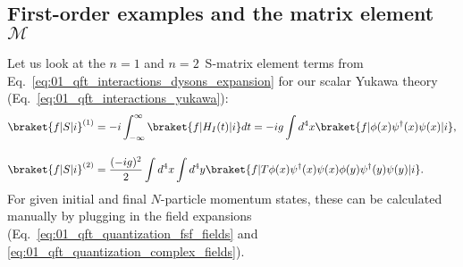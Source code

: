 \subsection{First-order examples and the matrix element \texorpdfstring{$\mathcal M$}{M}}
\label{sec:01_qft_quantization_firstorder}

Let us look at the $n = 1$ and $n = 2\,$ S-matrix element terms from Eq.~\ref{eq:01_qft_interactions_dysons_expansion} for our scalar Yukawa theory (Eq.~\ref{eq:01_qft_interactions_yukawa}):
\begin{equation}
	\label{eq:01_qft_interactions_yukawa_smatrix_terms}
	\begin{split}
		\braket{f|S|i}^{(1)} &= -i \int_{-\infty}^\infty \braket{f|H_I(t)|i}dt = -ig \int d^4x \braket{f|\phi(x)\psi^\dagger(x)\psi(x)|i}, \\[1em]
		\braket{f|S|i}^{(2)} &= \frac{(-ig)^2}{2} \int d^4x \int d^4y \braket{f|T \phi(x)\psi^\dagger(x)\psi(x)\phi(y)\psi^\dagger(y)\psi(y)|i}.
	\end{split}
\end{equation}
For given initial and final $N$-particle momentum states, these can be calculated manually by plugging in the field expansions (Eq.~\ref{eq:01_qft_quantization_fsf_fields} and \ref{eq:01_qft_quantization_complex_fields}).

